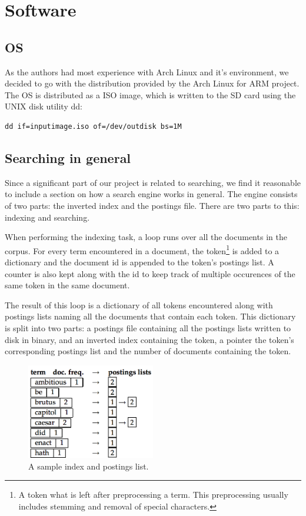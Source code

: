 \clearpage
\section{Software}
\subsection{OS}
As the authors had most experience with Arch Linux and it's environment, we decided to go with the distribution provided by the Arch Linux for ARM project.
The OS is distributed as a ISO image, which is written to the SD card using the UNIX disk utility dd:
\begin{lstlisting}
dd if=inputimage.iso of=/dev/outdisk bs=1M
\end{lstlisting}

\subsection{Searching in general}
Since a significant part of our project is related to searching, we find it reasonable to include a section on how a search engine works in general. The engine consists of two parts: the inverted index and the postings file. There are two parts to this: indexing and searching.

When performing the indexing task, a loop runs over all the documents in the corpus. For every term encountered in a document, the token\footnote{A token what is left after preprocessing a term. This preprocessing usually includes stemming and removal of special characters.} is added to a dictionary and the document id is appended to the token's postings list. A counter is also kept along with the id to keep track of multiple occurences of the same token in the same document.

The result of this loop is a dictionary of all tokens encountered along with postings lists naming all the documents that contain each token. This dictionary is split into two parts: a postings file containing all the  postings lists written to disk in binary, and an inverted index containing the token, a pointer the token's corresponding postings list and the number of documents containing the token.

\begin{figure}[h]
    \includegraphics[width=0.5\textwidth]{software/index_postings_lists}
    \caption{A sample index and postings list.}
    \label{fig:index_postings_lists_sw}
\end{figure}

